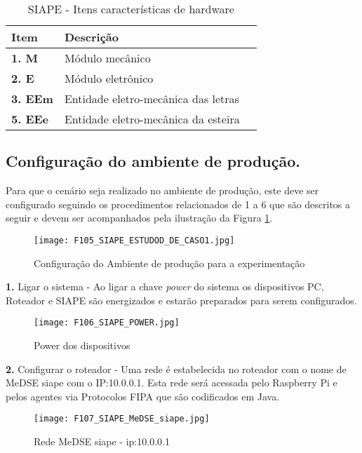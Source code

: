 \begin{table}
	\centering
	\caption{SIAPE - Itens características  de hardware}
	\begin{tabular}{|p{4cm}| p{11cm}|l| } \hline
			\textbf{ Item }	   & \textbf{ Descrição}	 \\ \hline
		\textbf{1. M }   & Módulo mecânico\\ \hline
		\textbf{2. E}    & Módulo eletrônico\\ \hline
		\textbf{3.  EEm}  & Entidade eletro-mecânica das letras\\ \hline				
		\textbf{5. EEe}	 & Entidade eletro-mecânica da esteira\\ \hline
	\end{tabular}
	\label{T6}\par
\end{table}	


\subsection{Configuração do ambiente de produção.}
Para que o cenário seja realizado no ambiente de produção, este deve ser configurado seguindo os procedimentos relacionados de 1 a 6 que são descritos a seguir e devem ser acompanhados pela ilustração da Figura \ref{F105}.\par 
		\begin{figure}[!h]
			\centering
			\texttt{[image: F105\_SIAPE\_ESTUDOD\_DE\_CASO1.jpg]} 
			\caption{Configuração do Ambiente de produção para a experimentação}
			\label{F105}
		\end{figure}
		
		
	\textbf{1.} Ligar o sistema -
			Ao ligar a chave \textit{power} do sistema os dispositivos PC, Roteador e SIAPE são energizados e estarão preparados para serem configurados. 
			
	\begin{figure}[!h]
		\centering
		\texttt{[image: F106\_SIAPE\_POWER.jpg]} 
		\caption{Power dos dispositivos}
		\label{F106}
	\end{figure}	
			
			
		\textbf{2.} Configurar o roteador -
			Uma rede é estabelecida no roteador com o nome de MeDSE siape com o IP:10.0.0.1. Esta rede será acessada pelo Raspberry Pi e pelos agentes via Protocolos FIPA que são codificados em Java. 
			
				\begin{figure}[!h]
					\centering
					\texttt{[image: F107\_SIAPE\_MeDSE\_siape.jpg]} 
					\caption{Rede MeDSE siape - ip:10.0.0.1}
					\label{F107}
				\end{figure}
			
